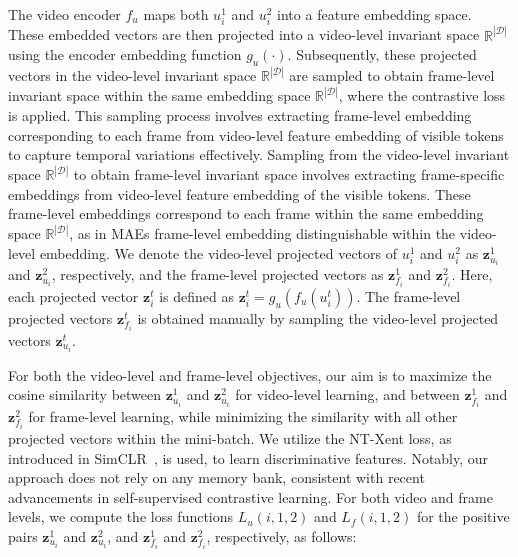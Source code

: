 The video encoder \(f_{u}\) maps both \(u_{i}^{1}\) and \(u_{i}^{2}\) into a feature embedding space. These embedded vectors are then projected into a video-level invariant space \(\mathbb{R}^{|\mathcal{D}|}\) using the encoder embedding function \(g_{u}(\cdot)\). Subsequently, these projected vectors in the video-level invariant space $\mathbb{R}^{|\mathcal{D}|}$ are sampled to obtain frame-level invariant space within the same embedding space \(\mathbb{R}^{|\mathcal{D}|}\), where the contrastive loss is applied. This sampling process involves extracting frame-level embedding corresponding to each frame from video-level feature embedding of visible tokens to capture temporal variations effectively. Sampling from the video-level invariant space \(\mathbb{R}^{|\mathcal{D}|}\) to obtain frame-level invariant space involves extracting frame-specific embeddings from video-level feature embedding of the visible tokens. These frame-level embeddings correspond to each frame within the same embedding space \(\mathbb{R}^{|\mathcal{D}|}\), as in MAEs frame-level embedding distinguishable within the video-level embedding. We denote the video-level projected vectors of \(u_{i}^{1}\) and \(u_{i}^{2}\) as \(\textbf{z}_{u_i}^{1}\) and \(\textbf{z}_{u_i}^{2}\), respectively, and the frame-level projected vectors as \(\textbf{z}_{f_i}^{1}\) and \(\textbf{z}_{f_i}^{2}\). Here, each projected vector \(\textbf{z}_{i}^t\) is defined as \(\textbf{z}_{i}^t = g_{u}(f_{u}(u_{i}^t))\). The frame-level projected vectors $\textbf{z}_{f_i}^t$ is obtained manually by sampling the video-level projected vectors $\textbf{z}_{u_i}^t$. 

For both the video-level and frame-level objectives, our aim is to maximize the cosine similarity between \(\textbf{z}_{u_i}^{1}\) and \(\textbf{z}_{u_i}^{2}\) for video-level learning, and between \(\textbf{z}_{f_i}^{1}\) and \(\textbf{z}_{f_i}^{2}\) for frame-level learning, while minimizing the similarity with all other projected vectors within the mini-batch. We utilize the NT-Xent loss, as introduced in SimCLR~\cite{chen2020simple}, is used, to learn discriminative features. Notably, our approach does not rely on any memory bank, consistent with recent advancements in self-supervised contrastive learning. For both video and frame levels, we compute the loss functions \(L_{u}(i, 1, 2)\) and \(L_{f}(i, 1, 2)\) for the positive pairs \(\textbf{z}_{u_i}^{1}\) and \(\textbf{z}_{u_i}^{2}\), and \(\textbf{z}_{f_i}^{1}\) and \(\textbf{z}_{f_i}^{2}\), respectively, as follows:

